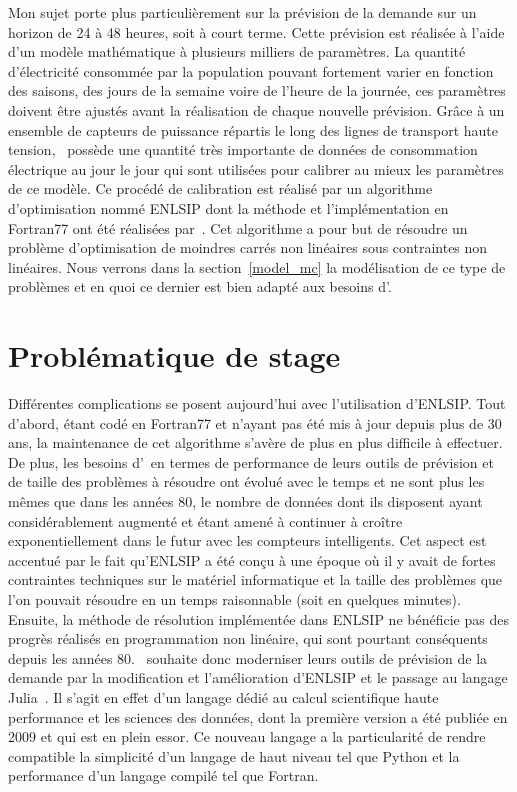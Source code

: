 Mon sujet porte plus particulièrement sur la prévision de la demande sur un horizon de 24 à 48 heures, soit à court terme. Cette prévision est réalisée à l’aide 
d’un modèle mathématique à plusieurs milliers de paramètres. La quantité d'électricité consommée par la population pouvant fortement varier en fonction des saisons, 
des jours de la semaine voire de l'heure de la journée, ces paramètres doivent être ajustés avant la réalisation de chaque nouvelle prévision. 
Gr\^ace \`a un ensemble de capteurs de puissance répartis le long des lignes de transport haute tension, 
\HQ\ possède une quantité très importante de données de consommation électrique au jour le jour qui sont utilisées pour calibrer au mieux les paramètres de ce modèle. Ce procédé de calibration est réalisé par un algorithme 
d'optimisation nommé ENLSIP dont la méthode et l'implémentation en Fortran77 ont été réalisées par~\citet{lindwedin88}. 
Cet algorithme a pour but de résoudre un problème d’optimisation de moindres carrés non linéaires sous contraintes non 
linéaires. Nous verrons dans la section~\ref{model_mc} la modélisation de ce type de problèmes et en quoi ce dernier est 
bien adapté aux besoins d'\HQ.

\section*{Problématique de stage}\label{problematique}

Différentes complications se posent aujourd'hui avec l'utilisation d'ENLSIP. Tout d'abord, étant codé en Fortran77 et n'ayant pas 
été mis à jour depuis plus de 30 ans, la maintenance de cet algorithme s'avère de plus en plus difficile à effectuer. 
De plus, les besoins d'\HQ\ en termes de performance de leurs outils de prévision et de taille des problèmes à 
résoudre ont évolué avec le temps et ne sont plus les mêmes que dans les années 80, le nombre de données dont ils 
disposent ayant considérablement augmenté et étant amené à continuer à croître exponentiellement dans le futur avec les compteurs intelligents. 
Cet aspect est accentué par le fait qu'ENLSIP a été conçu à une époque où 
il y avait de fortes contraintes techniques sur le matériel informatique et la taille des problèmes que l'on pouvait 
résoudre en un temps raisonnable (soit en quelques minutes). Ensuite, la méthode de résolution implémentée dans 
ENLSIP ne bénéficie pas des progrès réalisés en programmation non linéaire, qui sont pourtant conséquents depuis les 
années 80. \HQ\ souhaite donc moderniser leurs outils de prévision de la demande par la modification et l'amélioration d'ENLSIP et le 
passage au langage Julia~\cite{Julia-2017}. Il s'agit en effet d'un langage dédié au calcul scientifique haute performance et les sciences des données, dont 
la première version a été publiée en 2009 et qui est en plein essor. Ce nouveau langage a la particularité de rendre compatible la simplicité d'un langage de haut niveau 
tel que Python et la performance d'un langage compilé tel que Fortran.


